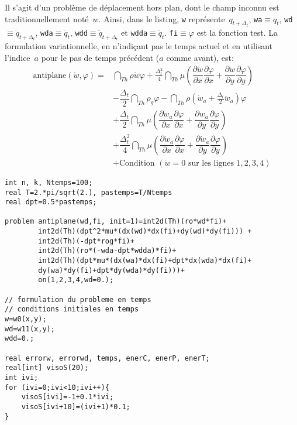 Il s'agit d'un problème de déplacement hors plan, dont le champ inconnu est traditionnellement noté~$w$. Ainsi, dans le listing, \verb|w| représente~$q_{t+\Delta_t}$, \verb|wa|$\equiv q_t$, 
\verb|wd|$\equiv \dot{q}_{t+\Delta_t}$, \verb|wda|$\equiv \dot{q}_t$, 
\verb|wdd|$\equiv \ddot{q}_{t+\Delta_t}$ et \verb|wdda|$\equiv \ddot{q}_t$. \verb|fi|$\equiv\varphi$
est la fonction test. La formulation variationnelle, en n'indiçant pas le temps actuel et en utilisant l'indice~$a$ pour le pas de temps précédent ($a$ comme avant), est:
\begin{equation}
\begin{array}{rl}
\text{antiplane}(\dot{w},\varphi) = &
	\dint_{Th} \rho \dot{w} \varphi + 
		\frac{\Delta_t^2}4 \dint_{Th} \mu \left( \dfrac{\partial \dot{w}}{\partial x}\dfrac{\partial \varphi}{\partial x} +
		\dfrac{\partial \dot{w}}{\partial y}\dfrac{\partial \varphi}{\partial y}\right)\\[+3ex]
	& - 	\dfrac{\Delta_t}2 \dint_{Th} \rho_g \varphi 
	- \dint_{Th} \rho\left(\dot{w}_a+\frac{\Delta_t}2 \ddot{w}_a\right)\varphi \\[+3ex]
	& + \dfrac{\Delta_t}2 \dint_{Th} \mu \left( \dfrac{\partial w_a}{\partial x}\dfrac{\partial \varphi}{\partial x}
		+ \dfrac{\partial w_a}{\partial y}\dfrac{\partial \varphi}{\partial y} \right) \\[+3ex]
	& + \dfrac{\Delta_t^2}4 \dint_{Th} \mu \left( \dfrac{\partial \dot{w}_a}{\partial x}\dfrac{\partial \varphi}{\partial x} +
		\dfrac{\partial \dot{w}_a}{\partial y}\dfrac{\partial \varphi}{\partial y} \right) \\[+3ex]
	& + \text{Condition } (\dot{w}=0 \text{ sur les lignes } 1,2,3,4)
\end{array}
\end{equation}

\begin{lstlisting}[firstnumber=last]
int n, k, Ntemps=100; 
real T=2.*pi/sqrt(2.), pastemps=T/Ntemps
real dpt=0.5*pastemps; 

problem antiplane(wd,fi, init=1)=int2d(Th)(ro*wd*fi)+ 
		int2d(Th)(dpt^2*mu*(dx(wd)*dx(fi)+dy(wd)*dy(fi))) + 
		int2d(Th)(-dpt*rog*fi)+
		int2d(Th)(ro*(-wda-dpt*wdda)*fi)+
		int2d(Th)(dpt*mu*(dx(wa)*dx(fi)+dpt*dx(wda)*dx(fi)+
		dy(wa)*dy(fi)+dpt*dy(wda)*dy(fi)))+
		on(1,2,3,4,wd=0.); 

// formulation du probleme en temps
// conditions initiales en temps
w=w0(x,y);
wd=w11(x,y); 
wdd=0.; 

real errorw, errorwd, temps, enerC, enerP, enerT; 
real[int] visoS(20);
int ivi; 
for (ivi=0;ivi<10;ivi++){
	visoS[ivi]=-1+0.1*ivi;
	visoS[ivi+10]=(ivi+1)*0.1;
}
\end{lstlisting}

